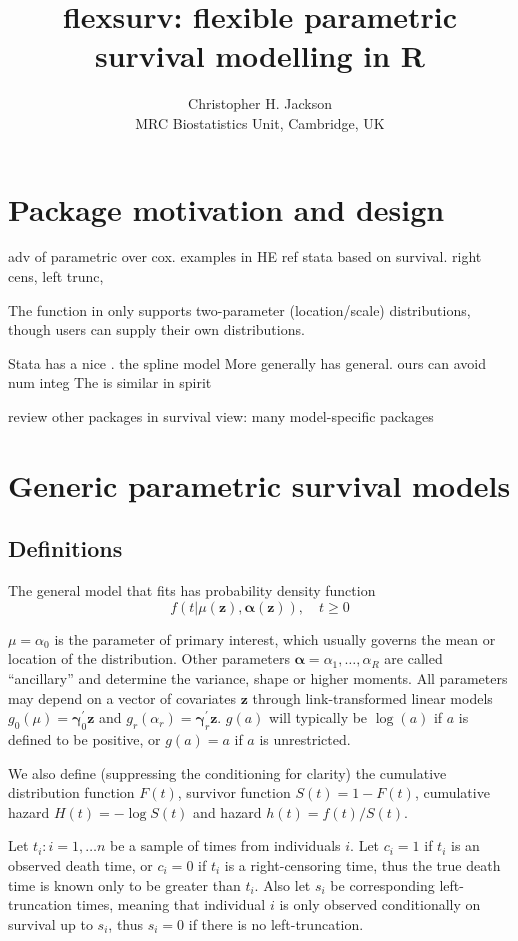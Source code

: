 \documentclass[nojss,nofooter]{jss}\usepackage[]{graphicx}\usepackage[]{color}
\author{Christopher H. Jackson \\ MRC Biostatistics Unit, Cambridge, UK \\ \email{chris.jackson@mrc-bsu.cam.ac.uk}}
\title{flexsurv: flexible parametric survival modelling in R}
\begin{document}
\section{Package motivation and design}

adv of parametric over cox. examples in HE
ref stata
based on survival.  right cens, left trunc,

The  function in  only supports
two-parameter (location/scale) distributions, though users can supply
their own distributions.

Stata has a nice .  the  spline model
More generally  has general.   ours can avoid num integ
The  is similar in spirit

review other packages in survival view: many model-specific packages

\section{Generic parametric survival models}

\subsection{Definitions} 

The general model that  fits has probability density function
\begin{equation}
  \label{eq:model}
f(t | \mu(\mathbf{z}), \bm{\alpha}(\mathbf{z})), \quad t \geq 0  
\end{equation}

$\mu=\alpha_0$ is the parameter of primary interest,
which usually governs the mean or location of the distribution.  Other
parameters $\mathbf{\alpha} = \alpha_1, \ldots, \alpha_R$ are called
``ancillary'' and determine the variance, shape or higher moments.
All parameters may depend on a vector of covariates $\mathbf{z}$
through link-transformed linear models $g_0(\mu) = \bm{\gamma}_0^{'}
\mathbf{z}$ and $g_r(\alpha_r) = \bm{\gamma}_r^{'} \mathbf{z}$. $g(a)$ will
typically be $\log(a)$ if $a$ is defined to be positive, or $g(a)=a$
if $a$ is unrestricted.

We also define (suppressing the conditioning for clarity) the
cumulative distribution function $F(t)$, survivor function $S(t) = 1 -
F(t)$, cumulative hazard $H(t) = -\log S(t)$ and hazard $h(t) =
f(t)/S(t)$.

Let $t_i: i=1,\ldots n$ be a sample of times from individuals $i$.
Let $c_i=1$ if $t_i$ is an observed death time, or $c_i=0$ if $t_i$ is
a right-censoring time, thus the true death time is known only to be
greater than $t_i$.  Also let $s_i$ be corresponding left-truncation
times, meaning that individual $i$ is only observed conditionally on
survival up to $s_i$, thus $s_i=0$ if there is no left-truncation.
\end{document}
